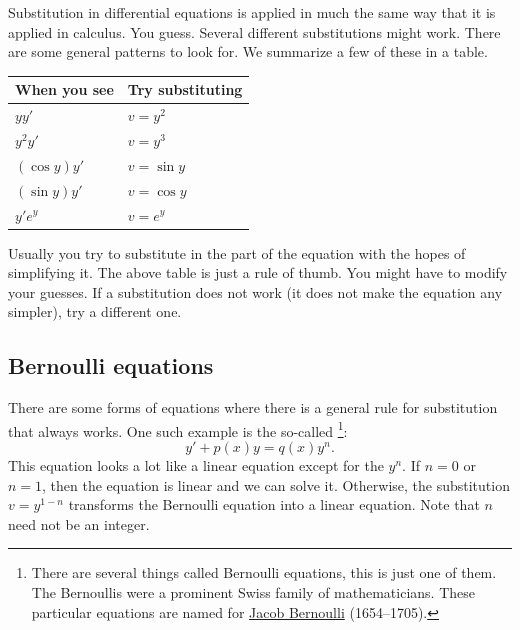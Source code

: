 \documentclass[12pt]{book}
\begin{document}
\medskip

Substitution in differential equations is applied in much the same way that
it is applied in calculus.  You guess.  Several different substitutions might
work.  There are some general patterns to look for.  We summarize a few
of these in a table.

\begin{center}
\begin{tabular}{@{}ll@{}}
\toprule
When you see & Try substituting \\
\midrule
$yy'$ & $v=y^2$ \\
$y^2y'$ & $v=y^3$ \\
$(\cos y)y'$ & $v=\sin y$ \\
$(\sin y)y'$ & $v=\cos y$ \\
$y'e^y$ & $v=e^y$ \\ \bottomrule
\end{tabular}
\end{center}

Usually you try to substitute in the  part of the
equation with the hopes of simplifying it.  The above table is just a rule
of thumb.  You might have to modify your guesses.  If a substitution
does not work (it does not make the equation any simpler), try a different one.

\subsection{Bernoulli equations}

There are some forms of equations where there is a
general rule for substitution that always works.
One such example is the so-called
\emph{}%
\footnote{There are several things called Bernoulli equations, this is just one
of them.  The Bernoullis were a prominent Swiss family of mathematicians.  These
particular equations are named for
\href{http://en.wikipedia.org/wiki/Jacob_Bernoulli}{Jacob Bernoulli} (1654--1705).}:
\begin{equation*}
y' + p(x)y = q(x)y^n .
\end{equation*}
This equation
looks a lot like a linear equation except for the $y^n$.  If $n=0$ or
$n=1$, then the equation is linear and we can solve it.  Otherwise,
the substitution $v=y^{1-n}$ transforms the 
Bernoulli equation into a linear equation.  Note that $n$
need not be an integer.
\end{document}
